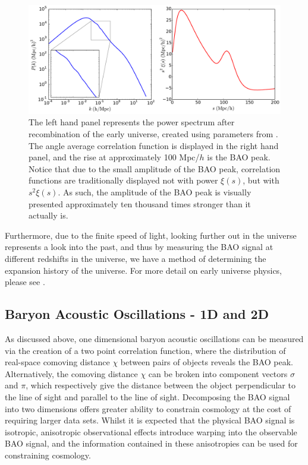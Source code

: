 \documentclass[titlesmallcaps, examinerscopy, copyrightpage]{uqthesis}
\begin{document}
\begin{figure}[h!]
  \begin{center}
    \includegraphics[width=\textwidth]{images/Backgroundpk2xi.pdf}
  \end{center}
  \caption{The left hand panel represents the power spectrum after recombination of the early universe, created using parameters from \citet{Planck201416}. The angle average correlation function is displayed in the right hand panel, and the rise at approximately 100 Mpc/$h$ is the BAO peak. Notice that due to the small amplitude of the BAO peak, correlation functions are traditionally displayed not with power $\xi(s)$, but with $s^2 \xi(s)$. As such, the amplitude of the BAO peak is visually presented approximately ten thousand times stronger than it actually is.}
  \label{fig:Backgroundpk2xi}
\end{figure}



Furthermore, due to the finite speed of light, looking further out in the universe represents a look into the past, and thus by measuring the BAO signal at different redshifts in the universe, we have a method of determining the expansion history of the universe. For more detail on early universe physics, please see \citet{BashinskyBertschinger2001,BashinskyBertschinger2002}.



\subsection{Baryon Acoustic Oscillations - 1D and 2D}

As discussed above, one dimensional baryon acoustic oscillations can be measured via the creation of a two point correlation function, where the distribution of real-space comoving distance $\chi$ between pairs of objects reveals the BAO peak. Alternatively, the comoving distance $\chi$ can be broken into component vectors $\sigma$ and $\pi$, which respectively give the distance between the object perpendicular to the line of sight and parallel to the line of sight. Decomposing the BAO signal into two dimensions offers greater ability to constrain cosmology at the cost of requiring larger data sets. Whilst it is expected that the physical BAO signal is isotropic, anisotropic observational effects introduce warping into the observable BAO signal, and the information contained in these anisotropies can be used for constraining cosmology. \\
\end{document}
